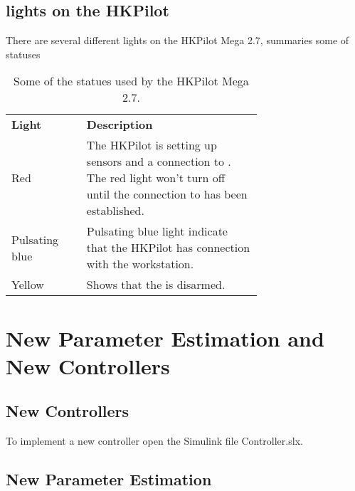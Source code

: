\subsection{\abbrLED lights on the HKPilot}
There are several different \abbrLED lights on the HKPilot Mega 2.7,  summaries some of \abbrLED statuses
 \begin{table}[tbp]
  \centering
  \caption{\label{tab:ledStatus}%
    Some of the \abbrLED statues used by the HKPilot Mega 2.7.}
  \begin{tabular}{l p{0.7\linewidth}}
    \toprule%
    \textbf{Light}  & \textbf{Description} \\
    \otoprule%
    Red 				& The HKPilot is setting up sensors and a connection to \abbrROS. The red light won't turn off until the connection to \abbrROS has been established.\\
    \midrule
    Pulsating blue 	& Pulsating blue light indicate that the HKPilot has connection with the workstation.\\
    \midrule
    Yellow 			& Shows that the \abbrROV is disarmed. \\
    \bottomrule%
  \end{tabular}
\end{table}

\section{New Parameter Estimation and New Controllers}

\subsection{New Controllers}
To implement a new controller open the Simulink file Controller.slx. 



\subsection{New Parameter Estimation}

